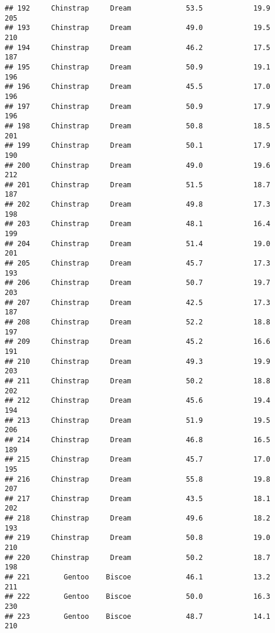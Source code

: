 \documentclass[
]{article}
\begin{document}
\begin{verbatim}
## 192     Chinstrap     Dream             53.5            19.9               205
## 193     Chinstrap     Dream             49.0            19.5               210
## 194     Chinstrap     Dream             46.2            17.5               187
## 195     Chinstrap     Dream             50.9            19.1               196
## 196     Chinstrap     Dream             45.5            17.0               196
## 197     Chinstrap     Dream             50.9            17.9               196
## 198     Chinstrap     Dream             50.8            18.5               201
## 199     Chinstrap     Dream             50.1            17.9               190
## 200     Chinstrap     Dream             49.0            19.6               212
## 201     Chinstrap     Dream             51.5            18.7               187
## 202     Chinstrap     Dream             49.8            17.3               198
## 203     Chinstrap     Dream             48.1            16.4               199
## 204     Chinstrap     Dream             51.4            19.0               201
## 205     Chinstrap     Dream             45.7            17.3               193
## 206     Chinstrap     Dream             50.7            19.7               203
## 207     Chinstrap     Dream             42.5            17.3               187
## 208     Chinstrap     Dream             52.2            18.8               197
## 209     Chinstrap     Dream             45.2            16.6               191
## 210     Chinstrap     Dream             49.3            19.9               203
## 211     Chinstrap     Dream             50.2            18.8               202
## 212     Chinstrap     Dream             45.6            19.4               194
## 213     Chinstrap     Dream             51.9            19.5               206
## 214     Chinstrap     Dream             46.8            16.5               189
## 215     Chinstrap     Dream             45.7            17.0               195
## 216     Chinstrap     Dream             55.8            19.8               207
## 217     Chinstrap     Dream             43.5            18.1               202
## 218     Chinstrap     Dream             49.6            18.2               193
## 219     Chinstrap     Dream             50.8            19.0               210
## 220     Chinstrap     Dream             50.2            18.7               198
## 221        Gentoo    Biscoe             46.1            13.2               211
## 222        Gentoo    Biscoe             50.0            16.3               230
## 223        Gentoo    Biscoe             48.7            14.1               210

\end{verbatim}
\end{document}
